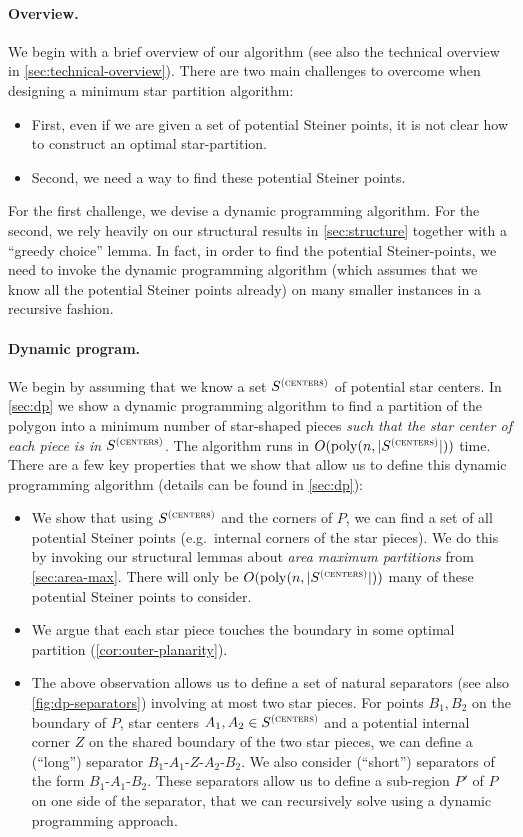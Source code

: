 \documentclass[10pt,a4paper]{article}
\newcommand\Scen{S^{\textsc{(centers)}}}
\newcommand\poly{\mathrm{poly}}
\begin{document}
\paragraph{Overview.} We begin with a brief overview of our algorithm (see also the technical overview in \cref{sec:technical-overview}).
There are two main challenges to overcome when designing a minimum star partition algorithm:
\begin{itemize}
\item First, even if we are given a set of potential Steiner points, it is not clear how to construct an optimal star-partition. 
\item Second, we need a way to find these potential Steiner points.
\end{itemize}
For the first challenge, we devise a dynamic programming algorithm. For the second, we rely heavily on our structural results in \cref{sec:structure} together with a ``greedy choice'' lemma. In fact, in order to find the potential Steiner-points, we need to invoke the dynamic programming algorithm (which assumes that we know all the potential Steiner points already) on many smaller instances in a recursive fashion.

\paragraph{Dynamic program.}
We begin by assuming that we know a set $\Scen$ of potential star centers. In \cref{sec:dp} we show a dynamic programming algorithm to find a partition of the polygon into a minimum number of star-shaped pieces \emph{such that the star center of each piece is in $\Scen$}. The algorithm runs in $O(\poly(n,|\Scen|))$ time. 
There are a few key properties that we show that allow us to define this dynamic programming algorithm (details can be found in \cref{sec:dp}):
\begin{itemize}
\item We show that using $\Scen$ and the corners of $P$, we can find a set of all potential Steiner points (e.g.\  internal corners of the star pieces). We do this by invoking our structural lemmas about \emph{area maximum partitions} from \cref{sec:area-max}. There will only be $O(\poly(n,|\Scen|))$ many of these potential Steiner points to consider.
\item We argue that each star piece touches the boundary in some optimal partition (\cref{cor:outer-planarity}).
\item
The above observation allows us to define a set of natural separators (see also \cref{fig:dp-separators}) involving at most two star pieces.
For points $B_1,B_2$ on the boundary of $P$, star centers $A_1,A_2\in \Scen$ and a potential internal corner $Z$ on the shared boundary of the two star pieces, we can define a (``long'') separator $B_1$-$A_1$-$Z$-$A_2$-$B_2$. We also consider (``short'') separators of the form $B_1$-$A_1$-$B_2$. These separators allow us to define a sub-region $P'$ of $P$ on one side of the separator, that we can recursively solve using a dynamic programming approach.
\end{itemize}
\end{document}
